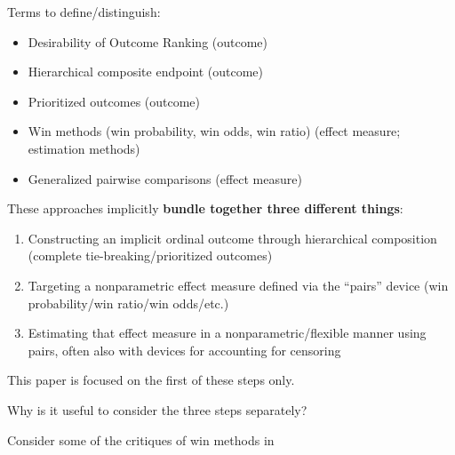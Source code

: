 \documentclass[
  11pt,
  fleqn
]{article}
\begin{document}
Terms to define/distinguish:
\begin{itemize}
  \item Desirability of Outcome Ranking (outcome)
  \item Hierarchical composite endpoint (outcome)
  \item Prioritized outcomes (outcome)
  \item Win methods (win probability, win odds, win ratio) (effect
    measure; estimation methods)
  \item Generalized pairwise comparisons (effect measure)
\end{itemize}

These approaches implicitly \textbf{bundle together three different things}:
\begin{enumerate}
  \item Constructing an implicit ordinal outcome through
    hierarchical composition (complete tie-breaking/prioritized outcomes)
  \item Targeting a nonparametric effect measure defined via the
    ``pairs'' device (win probability/win ratio/win odds/etc.)
  \item Estimating that effect measure in a nonparametric/flexible
    manner using pairs, often also with devices for accounting for censoring
\end{enumerate}

This paper is focused on the first of these steps only.

Why is it useful to consider the three steps separately?

Consider some of the critiques of win methods in
\citet[e.g.~][]{ajufoFallaciesUsingWin2023}
\end{document}
